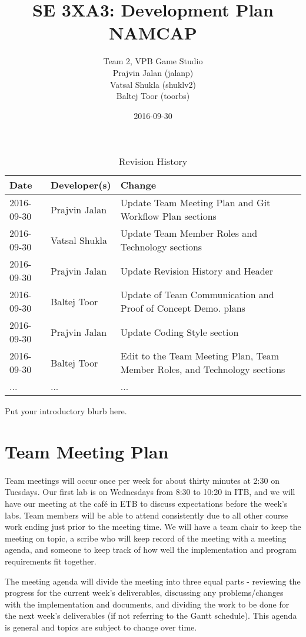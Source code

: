 \documentclass{article}
\title{SE 3XA3: Development Plan\\NAMCAP}
\author{Team 2, VPB Game Studio
		\\ Prajvin Jalan (jalanp)
		\\ Vatsal Shukla (shuklv2)
		\\ Baltej Toor (toorbs)
}
\date{2016-09-30}
\begin{document}
\begin{table}[hp]
\caption{Revision History} \label{TblRevisionHistory}
\begin{tabularx}{\textwidth}{llX}
\toprule
\textbf{Date} & \textbf{Developer(s)} & \textbf{Change}\\
\midrule
2016-09-30 & Prajvin Jalan & Update Team Meeting Plan and Git Workflow Plan sections\\
2016-09-30 & Vatsal Shukla & Update Team Member Roles and Technology sections \\
2016-09-30 & Prajvin Jalan & Update Revision History and Header\\
2016-09-30 & Baltej Toor & Update of Team Communication and Proof of Concept Demo. plans\\
2016-09-30 & Prajvin Jalan & Update Coding Style section\\
2016-09-30 & Baltej Toor & Edit to the Team Meeting Plan, Team Member Roles, and Technology sections\\ 
... & ... & ...\\
\bottomrule
\end{tabularx}
\end{table}

\newpage

\maketitle

Put your introductory blurb here.

\section{Team Meeting Plan}

\paragraph{}
Team meetings will occur once per week for about thirty minutes at 2:30 on Tuesdays. Our first lab is on Wednesdays from 8:30 to 10:20 in ITB, and we will have our meeting at the café in ETB to discuss expectations before the week's labs. Team members will be able to attend consistently due to all other course work ending just prior to the meeting time. We will have a team chair to keep the meeting on topic, a scribe who will keep record of the meeting with a meeting agenda, and someone to keep track of how well the implementation and program requirements fit together.\par The meeting agenda will divide the meeting into three equal parts - reviewing the progress for the current week's deliverables, discussing any problems/changes with the implementation and documents, and dividing the work to be done for the next week's deliverables (if not referring to the Gantt schedule). This agenda is general and topics are subject to change over time.
\end{document}
